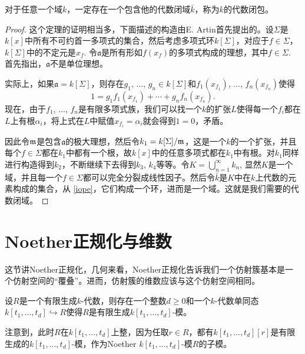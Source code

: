 \begin{thm}
对于任意一个域$k$，一定存在一个包含他的代数闭域$\bar{k}$，称为$k$的代数闭包。
\end{thm}

\begin{proof}
	这个定理的证明相当多，下面描述的构造由E. Artin首先提出的。设$\Sigma$是$k[x]$中所有不可约首一多项式的集合，然后考虑多项式环$k[\Sigma]$，对应于$f\in\Sigma$，$k[\Sigma]$中的不定元是$x_f$. 令$\mathfrak{a}$是所有形如$f(x_f)$的多项式构成的理想，其中$f\in\Sigma$. 首先指出，$\mathfrak{a}$不是单位理想。

	实际上，如果$\mathfrak{a}=k[\Sigma]$，则存在$g_1$, $\dots$, $g_n\in k[\Sigma]$和$f_1(x_{f_1})$, $\dots$, $f_n(x_{f_n})$使得
	\[
	1=g_1f_1(x_{f_1})+\cdots +g_nf_n(x_{f_n}).
	\]
	现在，由于$f_1$, $\dots$, $f_n$是有限多项式族，我们可以找一个$k$的扩张$L$使得每一个$f_i$都在$L$上有根$\alpha_i$，将上式在$L$中赋值$x_{f_i}=\alpha_i$就会得到$1=0$，矛盾。

	因此令$\mathfrak{m}$是包含$\mathfrak{a}$的极大理想，然后令$k_1=k[\Sigma]/\mathfrak{m}$，这是一个$k$的一个扩张，并且每个$f\in \Sigma$都在$k_1$中都有一个根，故$k[x]$中的任意多项式都在$k_1$中有根。对$k_1$同样进行构造得到$k_2$，不断继续下去得到$k_3$, $k_4$等等。令$K=\bigcup_{n=1}^\infty k_n$, 显然$K$是一个域，并且每一个$f\in \Sigma$都可以完全分裂成线性因子。然后令$\bar{k}$是$K$中在$k$上代数的元素构成的集合，从 \ref{iope}，它们构成一个环，进而是一个域。这就是我们需要的代数闭域。
\end{proof}

\section{Noether正规化与维数}

这节讲Noether正规化，几何来看，Noether正规化告诉我们一个仿射簇基本是一个仿射空间的“覆叠”。进而，仿射簇的维数应该与这个仿射空间相同。

\begin{pro}[Noether正规化引理]
设$R$是一个有限生成$k$-代数，则存在一个整数$d\geq 0$和一个$k$-代数单同态$k[t_1,\dots,t_d]\hookrightarrow R$使得$R$是有限生成$k[t_1,\dots,t_d]$-模。
\end{pro}

注意到，此时$R$在$k[t_1,\dots,t_d]$上整，因为任取$r\in R$，都有$k[t_1,\dots,t_d][r]$是有限生成的$k[t_1,\dots,t_d]$-模，作为Noether $k[t_1,\dots,t_d]$-模$R$的子模。

